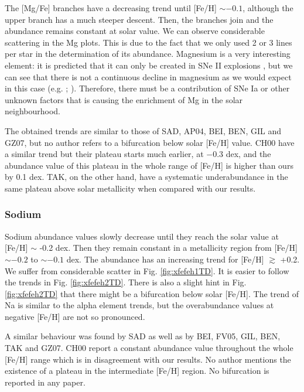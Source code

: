 \documentclass[oldversion]{aa}
\begin{document}
The [Mg/Fe] branches have a decreasing trend until [Fe/H] $\sim -0.1$, although the upper branch has a much steeper descent. Then, the branches join and the abundance remains constant at solar value. We can observe considerable scattering in the Mg plots. This is due to the fact that we only used 2 or 3 lines per star in the determination of its abundance. Magnesium is a very interesting element: it is predicted that it can only be created in SNe II explosions \citep{Chen-2000}, but we can see that there is not a continuous decline in magnesium as we would expect in this case (e.g. \citeauthor {Chen-2000} \citeyear {Chen-2000}; \citeauthor {Bensby-2003} \citeyear {Bensby-2003}). Therefore, there must be a contribution of SNe Ia or other unknown factors that is causing the enrichment of Mg in the solar neighbourhood. %

The obtained trends are similar to those of SAD, AP04, BEI, BEN, GIL and GZ07, but no author refers to a bifurcation below solar [Fe/H] value. CH00 have a similar trend but their plateau starts much earlier, at $-0.3$ dex, and the abundance value of this plateau in the whole range of [Fe/H] is higher than ours by 0.1 dex. TAK, on the other hand, have a systematic underabundance in the same plateau above solar metallicity when compared with our results.
 
\subsubsection{Sodium}

Sodium abundance values slowly decrease until they reach the solar value at [Fe/H] $\sim$ -0.2 dex. Then they remain constant in a metallicity region from [Fe/H] $\sim -0.2$ to $\sim -0.1$ dex. The abundance has an increasing trend for [Fe/H] $\gtrsim$ +0.2. We suffer from considerable scatter in Fig. \ref{fig:xfefeh1TD}. It is easier to follow the trends in Fig. \ref{fig:xfefeh2TD}. There is also a slight hint in Fig. \ref{fig:xfefeh2TD} that there might be a bifurcation below solar [Fe/H]. The trend of Na is similar to the alpha element trends, but the overabundance values at negative [Fe/H] are not so pronounced. %

A similar behaviour was found by SAD as well as by BEI, FV05, GIL, BEN, TAK and GZ07. CH00 report a constant abundance value throughout the whole [Fe/H] range which is in disagreement with our results. No author mentions the existence of a plateau in the intermediate [Fe/H] region. No bifurcation is reported in any paper.
\end{document}

